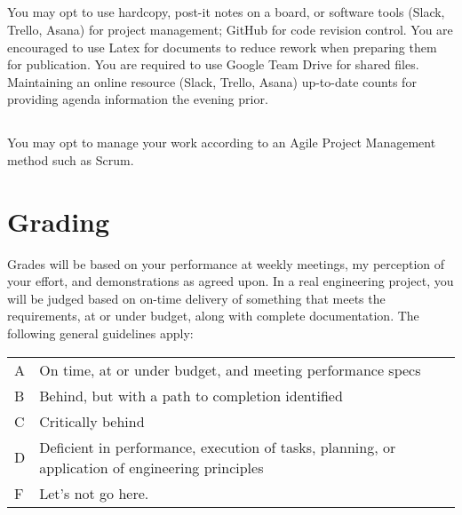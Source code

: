 \documentclass[10pt,courier]{navymemo}
\begin{document}
\subsection{} You may opt to use hardcopy, post-it notes on a board, or software tools (Slack, Trello, Asana) for project management; GitHub for code revision control. You are encouraged to use Latex for documents to reduce rework when preparing them for publication. You are required to use Google Team Drive for shared files. Maintaining an online resource (Slack, Trello, Asana) up-to-date counts for providing agenda information the evening prior. 
\subsection{} You may opt to manage your work according to an Agile Project Management method such as Scrum. 

\section{Grading}
Grades will be based on your performance at weekly meetings, my perception of your effort, and demonstrations as agreed upon.  In a real engineering project, you will be judged based on on-time delivery of something that meets the requirements, at or under budget, along with complete documentation. The following general guidelines apply: 
\begin{center}
\begin{tabular}{lp{5in}}
A & On time, at or under budget, and meeting performance specs \\
B & Behind, but with a path to completion identified \\
C & Critically behind \\
D & Deficient in performance, execution of tasks, planning, or application of engineering principles \\
F & Let's not go here. \\
\end{tabular}
\end{center}

\noclosing{}\\
\noindent\hspace*{4in}
\signature{D Evangelista}

\noindent\hspace*{4in}{235 Maury Hall}\\
\hspace*{4in}{(410) 293-6132}\\
\end{document}
